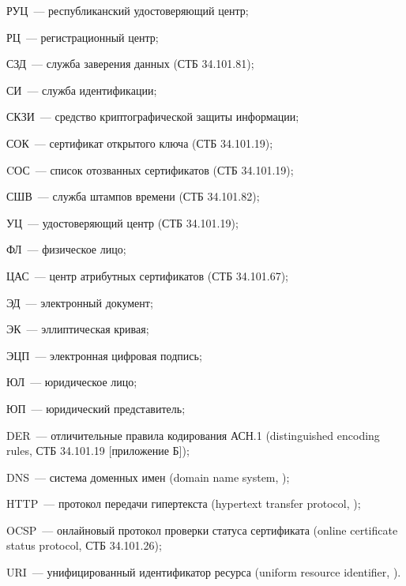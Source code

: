 РУЦ~--- республиканский удостоверяющий центр;

РЦ~--- регистрационный центр;

СЗД~--- служба заверения данных (СТБ 34.101.81);

СИ~--- служба идентификации;

СКЗИ~--- средство криптографической защиты информации;

СОК~--- сертификат открытого ключа (СТБ 34.101.19);

CОС~--- список отозванных сертификатов (СТБ 34.101.19);

СШВ~--- служба штампов времени (СТБ 34.101.82);

УЦ~--- удостоверяющий центр (СТБ 34.101.19);

ФЛ~--- физическое лицо;

ЦАС~--- центр атрибутных сертификатов (СТБ 34.101.67);

ЭД~--- электронный документ;

ЭК~--- эллиптическая кривая;

ЭЦП~--- электронная цифровая подпись;

ЮЛ~--- юридическое лицо;

ЮП~--- юридический представитель;

DER~--- отличительные правила кодирования АСН.1
(distinguished encoding rules, СТБ 34.101.19 [приложение Б]);

DNS~--- система доменных имен (domain name system, \cite{DNS});

HTTP~--- протокол передачи гипертекста 
(hypertext transfer protocol, \cite{HTTP});

OCSP~--- онлайновый протокол проверки статуса сертификата
(online certificate status protocol, СТБ 34.101.26);

URI~--- унифицированный идентификатор ресурса 
(uniform resource identifier, \cite{URI}).

